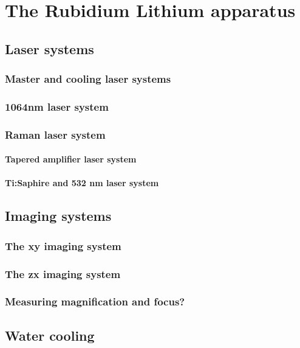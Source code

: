 


\renewcommand{\thechapter}{3}


\chapter{The Rubidium Lithium apparatus}

\section{Laser systems}
\subsection{Master and cooling laser systems}
\subsection{1064nm laser system}
\subsection{Raman laser system}
\subsubsection{Tapered amplifier laser system}
\subsubsection{Ti:Saphire and 532 nm laser system}

\section{Imaging systems}
\subsection{The xy imaging system}
\subsection{The zx imaging system}
\subsection{Measuring magnification and focus?}

\section{Water cooling}

